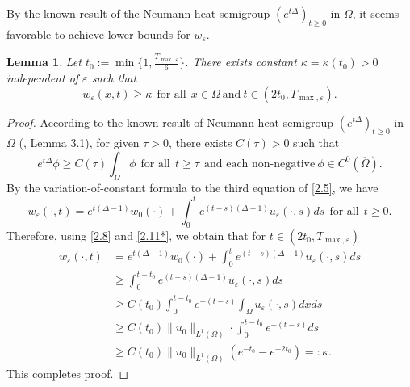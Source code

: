 \documentclass[12pt]{article}
\theoremstyle{plain}
\newtheorem{lemma}{Lemma}[section]
\theoremstyle{definition}
\numberwithin{equation}{section}
\begin{document}
By the known result of the Neumann heat semigroup $(e^{t\Delta})_{t\geq0}$ in $\Omega$,
it seems favorable to achieve lower bounds for $w_\varepsilon$.



\begin{lemma}\label{lemma2.2}Let
$t_0:=\min\{1,\frac{T_{\max,\varepsilon}}{6}\}$.
There exists constant $\kappa=\kappa(t_0)>0$ independent of $\varepsilon$ such that
$$w_\varepsilon(x,t)\geq\kappa~~\mbox{for all}~~x\in\Omega~\mbox{and}~t\in(2t_0,T_{\max,\varepsilon}).$$
\end{lemma}
\begin{proof}
According to the known result of Neumann heat semigroup $(e^{t\Delta})_{t\geq0}$ in $\Omega$ (\cite{Hillen(2013)}, Lemma 3.1), for given $\tau>0$, there exists $C(\tau)>0$ such that
\begin{equation}\label{2.11*}
e^{t\Delta}\phi\geq C(\tau)\int_{\Omega}\phi~~\mbox{for all}~~t\geq\tau~~\mbox{and each non-negative}~\phi\in C^0(\overline{\Omega}).
\end{equation}
By the variation-of-constant formula to the third equation of \eqref{2.5}, we have
\begin{equation}\label{2.11}
w_\varepsilon(\cdot,t)=e^{t(\Delta-1)}w_0(\cdot)+\int_0^t e^{(t-s)(\Delta-1)}u_\varepsilon(\cdot,s)ds~~\mbox{for all}~~t\geq0.
\end{equation}
Therefore, using  \eqref{2.8} and \eqref{2.11*}, we obtain that for $t\in(2t_0,T_{\max,\varepsilon})$
\begin{equation*}
\begin{split}
w_\varepsilon(\cdot,t)&=e^{t(\Delta-1)}w_0(\cdot)+\int_0^t e^{(t-s)(\Delta-1)}u_\varepsilon(\cdot,s)ds\\
&\geq\int_{0}^{t-t_0} e^{(t-s)(\Delta-1)}u_\varepsilon(\cdot,s)ds\\
&\geq C(t_0)\int_{0}^{t-t_0} e^{-(t-s)}\int_{\Omega}u_\varepsilon(\cdot,s)dxds\\
&\geq C(t_0)\|u_0\|_{L^1(\Omega)}\cdot\int_{0}^{t-t_0} e^{-(t-s)}ds\\
&\geq C(t_0)\|u_0\|_{L^1(\Omega)}(e^{-t_0}-e^{-2t_0})=:\kappa.
\end{split}
\end{equation*}
This completes proof.
\end{proof}
\end{document}
